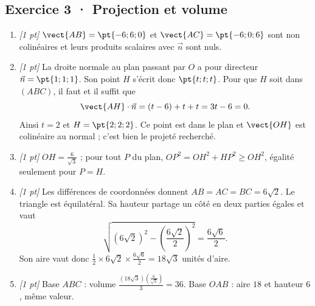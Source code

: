 \subsection*{Exercice 3 · Projection et volume}\begin{enumerate}

\item \textit{[1 pt]} $\vect{AB}=\pt{-6;6;0}$ et $\vect{AC}=\pt{-6;0;6}$ sont non colinéaires et leurs produits scalaires avec $\vec n$ sont nuls.

\item \textit{[1 pt]} La droite normale au plan passant par $O$ a pour directeur $\vec n=\pt{1;1;1}$. Son point $H$ s'écrit donc $\pt{t;t;t}$. Pour que $H$ soit dans $(ABC)$, il faut et il suffit que
\[\vect{AH}\cdot\vec n=(t-6)+t+t=3t-6=0.\]
Ainsi $t=2$ et $H=\pt{2;2;2}$. Ce point est dans le plan et $\vect{OH}$ est colinéaire au normal ; c'est bien le projeté recherché.

\item \textit{[1 pt]} $OH=\frac{6}{\sqrt{3}}$ ; pour tout $P$ du plan, $OP^2=OH^2+HP^2\ge OH^2$, égalité seulement pour $P=H$.

\item \textit{[1 pt]} Les différences de coordonnées donnent $AB=AC=BC=6\sqrt2$. Le triangle est équilatéral. Sa hauteur partage un côté en deux parties égales et vaut
\[\sqrt{(6\sqrt2)^2-(\frac{6\sqrt{2}}{2})^2}=\frac{6\sqrt6}{2}.\]
Son aire vaut donc $\frac12\times 6\sqrt2\times\frac{6\sqrt6}{2}=18\sqrt3$ unités d'aire.

\item \textit{[1 pt]} Base $ABC$ : volume $\frac{(18\sqrt3)(\frac{6}{\sqrt{3}})}{3}=36$. Base $OAB$ : aire $18$ et hauteur $6$, même valeur.

\end{enumerate}

